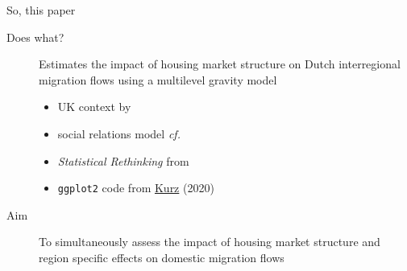 \documentclass{beamer}
\begin{document}
\begin{frame}{So, this paper}
  \begin{description}
  \item[Does what?] \alert{Estimates} the impact of housing market
	  structure on Dutch interregional migration flows using a
	  \alert{multilevel} gravity model
    \begin{footnotesize}
	\begin{itemize}
	  \item \footnotesize UK context by \citet{congdon2010random}
	  \item \footnotesize \alert{social relations model} \emph{cf.}
		\citet{koster2014food}
		\item \footnotesize \emph{Statistical Rethinking} from \citet{mcelreath2020statistical}
		\item \footnotesize \texttt{ggplot2} code from \href{https://bookdown.org/content/4857/}{Kurz} (2020) \newline
	\end{itemize}
  \end{footnotesize}
	\item[Aim] To \alert{simultaneously} assess the impact of housing market structure and region specific effects on domestic migration flows
  \end{description}
\end{frame}
\end{document}
